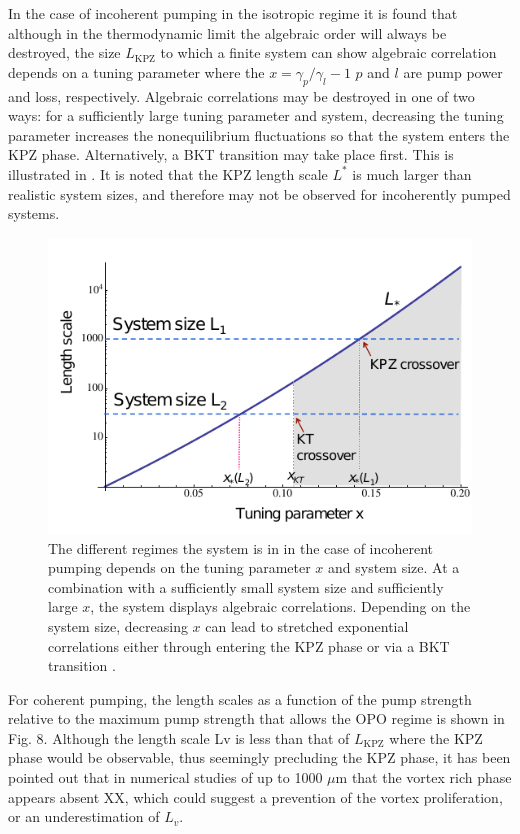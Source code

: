 In the case of incoherent pumping in the isotropic regime it is found that although in the thermodynamic limit the algebraic order will always be destroyed, the size $L_{\text{KPZ}}$ to which a finite system can show algebraic correlation depends on a tuning parameter where the $x = \gamma_p/\gamma_l - 1$ $p$ and $l$ are pump power and loss, respectively. Algebraic correlations may be destroyed in one of two ways: for a sufficiently large tuning parameter and system, decreasing the tuning parameter increases the nonequilibrium fluctuations so that the system enters the KPZ phase. Alternatively, a BKT transition may take place first. This is illustrated in \fig{\ref{fig:incoherentkpz}}.
It is noted that the KPZ length scale $L^*$ is much larger than realistic system sizes, and therefore may not be observed for incoherently pumped systems. 

\begin{figure}[htbp!]
	\centering
	\includegraphics[scale=0.4]{incoherentkpz.pdf}
	\caption{The different regimes the system is in in the case of incoherent pumping depends on the tuning parameter $x$ and system size. At a combination with a sufficiently small system size and sufficiently large $x$, the system displays algebraic correlations. Depending on the system size, decreasing $x$ can lead to stretched exponential correlations either through entering the KPZ phase or via a BKT transition \cite{2015PhRvX...5a1017A}.}
	\label{fig:incoherentkpz}
\end{figure}

For coherent pumping, the length scales as a function of the pump strength relative to the maximum pump strength that allows the OPO regime is shown in Fig. 8. Although the length scale Lv is less than that of $L_{\text{KPZ}}$ where the KPZ phase would be observable, thus seemingly precluding the KPZ phase, it has been pointed out that in numerical studies of up to 1000 $\mu$m that the vortex rich phase appears absent XX, which could suggest a prevention of the vortex proliferation, or an underestimation of $L_v$.

